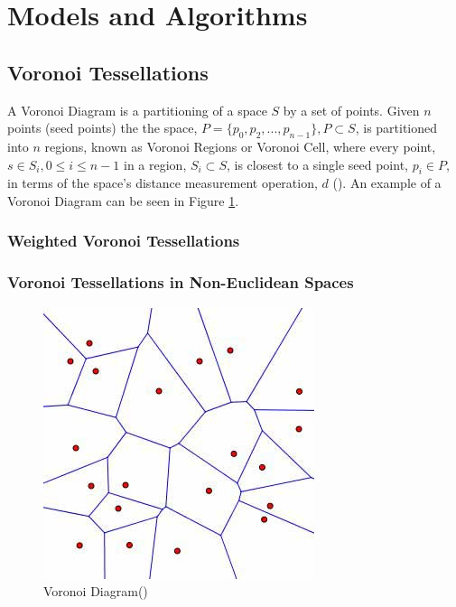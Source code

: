 \section{Models and Algorithms}\label{tes}
\subsection{Voronoi Tessellations}\label{tes:sec:vor}
A Voronoi Diagram is a partitioning of a space $S$ by a set of points. Given $n$ points (seed points) the the space, $P = \{p_0,p_2,...,p_{n-1}\}, P \subset S$, is partitioned into $n$ regions, known as Voronoi Regions or Voronoi Cell, where every point, $s \in S_i,0 \leq i \leq n-1$ in a region, $S_i \subset S$, is closest to a single seed point, $p_i \in P$, in terms of the space's distance measurement operation, $d$ (\cite{okabe2009spatial}). An example of a Voronoi Diagram can be seen in Figure \ref{tes:fig:voreg}.
%
\subsubsection{Weighted Voronoi Tessellations}\label{tes:ssec:wei}
%
\subsubsection{Voronoi Tessellations in Non-Euclidean Spaces}\label{tes:ssec:warp}
\begin{figure}[H]
	\centering
    \label{tes:fig:voreg}
    \includegraphics[scale=0.65]{Images/voronoi.jpg}
    \caption{Voronoi Diagram(\cite{voronoipic})}
\end{figure}
